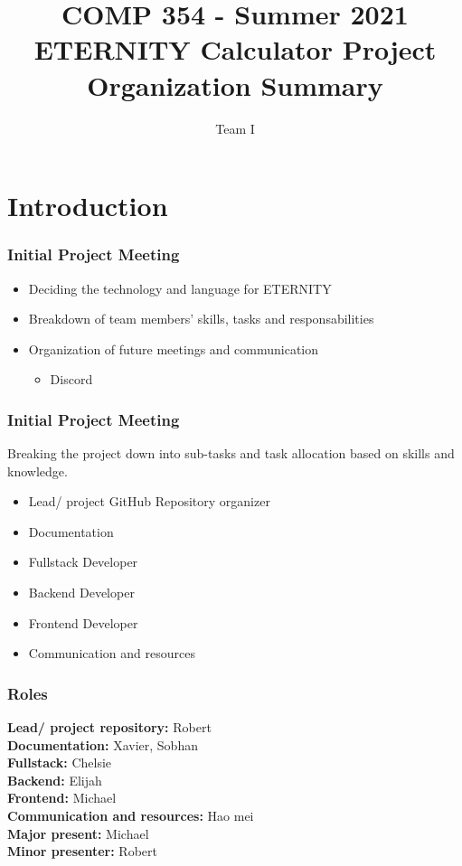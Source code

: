 \documentclass{beamer}
\title{COMP 354 - Summer 2021 \\ ETERNITY Calculator Project Organization Summary}
\author{Team I}
\date{} %
\begin{document}
\maketitle

\section{Introduction} %

\begin{frame}
\frametitle{Initial Project Meeting}
    \begin{itemize}
        \item Deciding the technology and language for ETERNITY \pause
        \item Breakdown of team members' skills, tasks and responsabilities \pause
        \item Organization of future meetings and communication
        \begin{itemize}
            \item Discord
        \end{itemize}
    \end{itemize}


\end{frame}

\begin{frame}
\frametitle{Initial Project Meeting}
    Breaking the project down into sub-tasks and task allocation based on skills and knowledge.
    \begin{itemize}
        \item Lead/ project GitHub Repository organizer 
        \item Documentation
        \item Fullstack Developer
        \item Backend Developer
        \item Frontend Developer
        \item Communication and resources
    \end{itemize}

\end{frame}

\begin{frame}
\frametitle{Roles}
    \textbf{Lead/ project repository:}
    Robert \\
    \textbf{Documentation:}
    Xavier, Sobhan \\
    \textbf{Fullstack:}
    Chelsie \\
    \textbf{Backend:}
    Elijah \\
    \textbf{Frontend:}
    Michael \\
    \textbf{Communication and resources:}
    Hao mei \\
    \textbf{Major present:}
    Michael \\
    \textbf{Minor presenter:}
    Robert \\
\end{frame}
\end{document}
